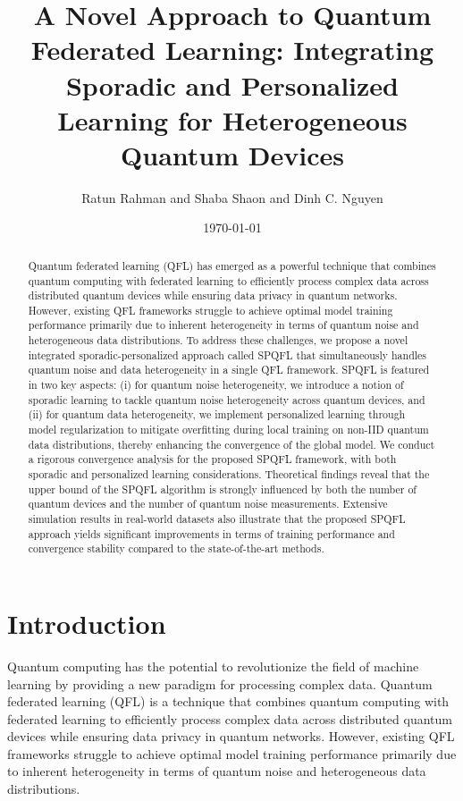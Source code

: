 \documentclass{article}
\begin{document}
\title{A Novel Approach to Quantum Federated Learning: Integrating Sporadic and Personalized Learning for Heterogeneous Quantum Devices}

\author{Ratun Rahman and Shaba Shaon and Dinh C. Nguyen}

\date{\today}

\maketitle

\begin{abstract}
Quantum federated learning (QFL) has emerged as a powerful technique that combines quantum computing with federated learning to efficiently process complex data across distributed quantum devices while ensuring data privacy in quantum networks. However, existing QFL frameworks struggle to achieve optimal model training performance primarily due to inherent heterogeneity in terms of quantum noise and heterogeneous data distributions. To address these challenges, we propose a novel integrated sporadic-personalized approach called SPQFL that simultaneously handles quantum noise and data heterogeneity in a single QFL framework. SPQFL is featured in two key aspects: (i) for quantum noise heterogeneity, we introduce a notion of sporadic learning to tackle quantum noise heterogeneity across quantum devices, and (ii) for quantum data heterogeneity, we implement personalized learning through model regularization to mitigate overfitting during local training on non-IID quantum data distributions, thereby enhancing the convergence of the global model. We conduct a rigorous convergence analysis for the proposed SPQFL framework, with both sporadic and personalized learning considerations. Theoretical findings reveal that the upper bound of the SPQFL algorithm is strongly influenced by both the number of quantum devices and the number of quantum noise measurements. Extensive simulation results in real-world datasets also illustrate that the proposed SPQFL approach yields significant improvements in terms of training performance and convergence stability compared to the state-of-the-art methods.
\end{abstract}

\section{Introduction}
Quantum computing has the potential to revolutionize the field of machine learning by providing a new paradigm for processing complex data. Quantum federated learning (QFL) is a technique that combines quantum computing with federated learning to efficiently process complex data across distributed quantum devices while ensuring data privacy in quantum networks. However, existing QFL frameworks struggle to achieve optimal model training performance primarily due to inherent heterogeneity in terms of quantum noise and heterogeneous data distributions.
\end{document}
